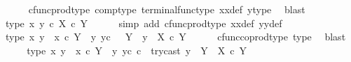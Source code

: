 \begin{isabellebody}
\ \ \ \ \isamarkupfalse%
\ cfunc{\isacharunderscore}{\kern0pt}prod{\isacharunderscore}{\kern0pt}type\ comp{\isacharunderscore}{\kern0pt}type\ terminal{\isacharunderscore}{\kern0pt}func{\isacharunderscore}{\kern0pt}type\ x{}x{}{\isacharunderscore}{\kern0pt}def\ y{}{\isacharprime}{\kern0pt}{\isacharunderscore}{\kern0pt}type\ \isamarkupfalse%
\ blast\isanewline
\ \ \isamarkupfalse%
\ type{}{\isacharcolon}{\kern0pt}\ {\isachardoublequoteopen}{\isasymlangle}x{}{\isacharcomma}{\kern0pt}\ y{}{\isasymrangle}\ {\isasymin}\isactrlsub c\ {\isacharparenleft}{\kern0pt}X\ {\isasymtimes}\isactrlsub c\ Y{\isacharparenright}{\kern0pt}{\isachardoublequoteclose}\isanewline
\ \ \ \ \isamarkupfalse%
\ {\isacharparenleft}{\kern0pt}simp\ add{\isacharcolon}{\kern0pt}\ cfunc{\isacharunderscore}{\kern0pt}prod{\isacharunderscore}{\kern0pt}type\ x{}x{}{\isacharunderscore}{\kern0pt}def\ y{}y{}{\isacharunderscore}{\kern0pt}def{\isacharparenright}{\kern0pt}\isanewline
\ \ \isamarkupfalse%
\ \isamarkupfalse%
\ type{}{\isacharcolon}{\kern0pt}\ {\isachardoublequoteopen}{\isasymlangle}x{}{\isacharcomma}{\kern0pt}\ y{}{\isasymrangle}\ {\isasymamalg}\ {\isasymlangle}x{}\ {\isasymcirc}\isactrlsub c\ {\isasymbeta}\isactrlbsub Y\ {\isasymsetminus}\ {\isacharparenleft}{\kern0pt}{\isasymone}{\isacharcomma}{\kern0pt}y{}{\isacharparenright}{\kern0pt}\isactrlesub {\isacharcomma}{\kern0pt}\ y{}\isactrlsup c{\isasymrangle}\ {\isacharcolon}{\kern0pt}{\isacharparenleft}{\kern0pt}{\isasymone}\ {\isasymCoprod}\ {\isacharparenleft}{\kern0pt}Y\ {\isasymsetminus}\ {\isacharparenleft}{\kern0pt}{\isasymone}{\isacharcomma}{\kern0pt}y{}{\isacharparenright}{\kern0pt}{\isacharparenright}{\kern0pt}{\isacharparenright}{\kern0pt}\ {\isasymrightarrow}\ {\isacharparenleft}{\kern0pt}X\ {\isasymtimes}\isactrlsub c\ Y{\isacharparenright}{\kern0pt}{\isachardoublequoteclose}\isanewline
\ \ \ \ \isamarkupfalse%
\ cfunc{\isacharunderscore}{\kern0pt}coprod{\isacharunderscore}{\kern0pt}type\ type{}\ \isamarkupfalse%
\ blast\isanewline
\ \ \isamarkupfalse%
\ \isamarkupfalse%
\ type{}{\isacharcolon}{\kern0pt}\ {\isachardoublequoteopen}{\isacharparenleft}{\kern0pt}{\isacharparenleft}{\kern0pt}{\isasymlangle}x{}{\isacharcomma}{\kern0pt}\ y{}{\isasymrangle}\ {\isasymamalg}\ {\isasymlangle}x{}\ {\isasymcirc}\isactrlsub c\ {\isasymbeta}\isactrlbsub Y\ {\isasymsetminus}\ {\isacharparenleft}{\kern0pt}{\isasymone}{\isacharcomma}{\kern0pt}y{}{\isacharparenright}{\kern0pt}\isactrlesub {\isacharcomma}{\kern0pt}\ y{}\isactrlsup c{\isasymrangle}{\isacharparenright}{\kern0pt}\ {\isasymcirc}\isactrlsub c\ \ try{\isacharunderscore}{\kern0pt}cast\ y{}{\isacharparenright}{\kern0pt}\ {\isacharcolon}{\kern0pt}\ Y\ {\isasymrightarrow}\ {\isacharparenleft}{\kern0pt}X\ {\isasymtimes}\isactrlsub c\ Y{\isacharparenright}{\kern0pt}{\isachardoublequoteclose}\isanewline

\end{isabellebody}
